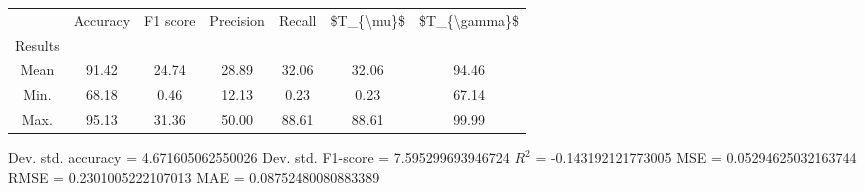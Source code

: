 \begin{tabular}{|c|c|c|c|c|c|c|}
\toprule
{} &  Accuracy &  F1 score &  Precision &  Recall &  \$T\_\{\textbackslash mu\}\$ &  \$T\_\{\textbackslash gamma\}\$ \\
Results &           &           &            &         &            &               \\
\hline
Mean    &     91.42 &     24.74 &      28.89 &   32.06 &      32.06 &         94.46 \\
Min.    &     68.18 &      0.46 &      12.13 &    0.23 &       0.23 &         67.14 \\
Max.    &     95.13 &     31.36 &      50.00 &   88.61 &      88.61 &         99.99 \\
\bottomrule
\end{tabular}

 Dev. std. accuracy = 4.671605062550026
 Dev. std. F1-score = 7.595299693946724
 $R^2$ = -0.143192121773005
 MSE = 0.05294625032163744
 RMSE = 0.2301005222107013
 MAE = 0.08752480080883389